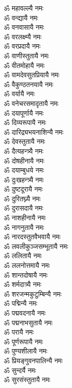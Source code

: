 \begin{flushleft}
\begin{multicols}{2}
ॐ महावल्ल्यै नमः\\
ॐ वन्द्यायै नमः\\
ॐ वनवासायै नमः\\
ॐ वरलक्ष्म्यै नमः\\
ॐ वरप्रदायै नमः\\
ॐ वाणीस्तुतायै नमः\\
ॐ वीतमोहायै नमः\\
ॐ वामदेवसुतप्रियायै नमः\\
ॐ वैकुण्ठतनयायै नमः\\
ॐ वर्यायै नमः\hfill{}\\
ॐ वनेचरसमादृतायै नमः\\
ॐ दयापूर्णायै नमः\\
ॐ दिव्यरूपायै नमः\\
ॐ दारिद्र्यभयनाशिन्यै नमः\\
ॐ देवस्तुतायै नमः\\
ॐ दैत्यहन्त्र्यै नमः\\
ॐ दोषहीनायै नमः\\
ॐ दयाम्बुधये नमः\\
ॐ दुःखहन्त्र्यै नमः\\
ॐ दुष्टदूरायै नमः\hfill{}\\
ॐ दुरितघ्न्यै नमः\\
ॐ दुरासदायै नमः\\
ॐ नाशहीनायै नमः\\
ॐ नागनुतायै नमः\\
ॐ नारदस्तुतवैभवायै नमः\\
ॐ लवलीकुञ्जसम्भूतायै नमः\\
ॐ ललितायै नमः\\
ॐ ललनोत्तमायै नमः\\
ॐ शान्तदोषायै नमः\\
ॐ शर्मदात्र्यै नमः\hfill{}\\
ॐ शरजन्मकुटुम्बिन्यै नमः\\
ॐ पद्मिन्यै नमः\\
ॐ पद्मवदनायै नमः\\
ॐ पद्मनाभसुतायै नमः \\
ॐ परायै नमः\\
ॐ पूर्णरूपायै नमः\\
ॐ पुण्यशीलायै नमः\\
ॐ प्रियङ्गुवनपालिन्यै नमः\\
ॐ सुन्दर्यै नमः\\
ॐ सुरसंस्तुतायै नमः\hfill{}\\

\end{multicols}
\end{flushleft}
